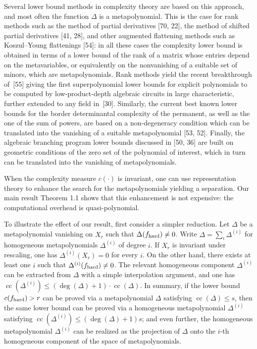 Several lower bound methods in complexity theory are based on this approach, and most often the function $\Delta$ is a metapolynomial. This is the case for rank methods such as the method of partial derivatives [70, 22], the method of shifted partial derivatives [41, 28], and other augmented flattening methods such as Koszul–Young flattenings [54]: in all these cases the complexity lower bound is obtained in terms of a lower bound of the rank of a matrix whose entries depend on the metavariables, or equivalently on the nonvanishing of a suitable set of minors, which are metapolynomials. Rank methods yield the recent breakthrough of [55] giving the first superpolynomial lower bounds for explicit polynomials to be computed by low-product-depth algebraic circuits in large characteristic, further extended to any field in [30].
Similarly, the current best known lower bounds for the border determinantal complexity of the permanent, as well as the one of the sum of powers, are based on a non-degeneracy condition which can be translated into the vanishing of a suitable metapolynomial [53, 52]. Finally, the algebraic branching program lower bounds discussed in [50, 36] are built on geometric conditions of the zero set of the polynomial of interest, which in turn can be translated into the vanishing of metapolynomials.





When the complexity measure $c(\cdot)$ is invariant, one can use representation theory to enhance the search for the metapolynomials yielding a separation. Our main result Theorem 1.1 shows that this enhancement is not expensive: the computational overhead is quasi-polynomial.





To illustrate the effect of our result, first consider a simpler reduction. Let $\Delta$ be a metapolynomial vanishing on $X_{r}$ such that $\Delta(f_{\textup{hard}})\neq 0$. Write $\Delta=\sum_{i}\Delta^{(i)}$ for homogeneous metapolynomials $\Delta^{(i)}$ of degree $i$. If $X_{r}$ is invariant under rescaling, one has $\Delta^{(i)}(X_{r})=0$ for every $i$. On the other hand, there exists at least one $i$ such that $\Delta^{(i)}(f_{\textup{hard}})\neq 0$. The relevant homogeneous component $\Delta^{(i)}$ can be extracted from $\Delta$ with a simple interpolation argument, and one has $\operatorname{cc}(\Delta^{(i)})\leq(\deg(\Delta)+1)\cdot\operatorname{cc}(\Delta)$. In summary, if the lower bound $c(f_{\textup{hard}})>r$ can be proved via a metapolynomial $\Delta$ satisfying $\operatorname{cc}(\Delta)\leq s$, then the same lower bound can be proved via a homogeneous metapolynomial $\Delta^{(i)}$ satisfying $\operatorname{cc}(\Delta^{(i)})\leq(\deg(\Delta)+1)s$; and even further, the homogeneous metapolynomial $\Delta^{(i)}$ can be realized as the projection of $\Delta$ onto the $i$-th homogeneous component of the space of metapolynomials.





